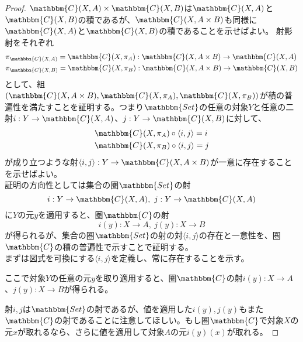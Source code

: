\documentclass[uplatex,dvipdfmx]{jsarticle}
\newcommand{\cat}[1]{\mathbbm{#1}}
\newcommand{\arrow}{\rightarrow}
\newcommand{\tuple}[1]{\langle #1\rangle}
\newcommand{\mor}[3]{#1:#2\arrow #3}
\newcommand{\arset}[3]{\cat{#1}(#2,#3)}
\newtheorem{proof}{証明}[section]
\numberwithin{proof}{subsection}
\begin{document}
	\begin{proof}
		$\arset{C}{X}{A}\times\arset{C}{X}{B}$は$\arset{C}{X}{A}$と$\arset{C}{X}{B}$の積であるが、$\arset{C}{X}{A\times B}$も同様に$\arset{C}{X}{A}$と$\arset{C}{X}{B}$の積であることを示せばよい。
		射影射をそれぞれ
		\begin{align*}
			&\pi_{\arset{C}{X}{A}}=\mor{\arset{C}{X}{\pi_A}}{\arset{C}{X}{A\times B}}{\arset{C}{X}{A}}\\
			&\pi_{\arset{C}{X}{B}}=\mor{\arset{C}{X}{\pi_B}}{\arset{C}{X}{A\times B}}{\arset{C}{X}{B}}
		\end{align*}
		として、組$(\arset{C}{X}{A\times B},\arset{C}{X}{\pi_A},\arset{C}{X}{\pi_B})$が積の普遍性を満たすことを証明する。つまり$\cat{Set}$の任意の対象$Y$と任意の二射$\mor{i}{Y}{\arset{C}{X}{A}}$、$\mor{j}{Y}{\arset{C}{X}{B}}$に対して、
		\begin{align*}
			&\arset{C}{X}{\pi_A}\circ\tuple{i,j}=i\\
			&\arset{C}{X}{\pi_B}\circ\tuple{i,j}=j
		\end{align*}
		が成り立つような射$\mor{\tuple{i,j}}{Y}{\arset{C}{X}{A\times B}}$が一意に存在することを示せばよい。\\
    証明の方向性としては集合の圏$\cat{Set}$の射\[\mor{i}{Y}{\arset{C}{X}{A}},\ \mor{j}{Y}{\arset{C}{X}{A}}\]に$Y$の元$y$を適用すると、圏$\cat{C}$の射\[\mor{i(y)}{X}{A},\ \mor{j(y)}{X}{B}\]が得られるが、集合の圏$\cat{Set}$の射の対$\tuple{i,j}$の存在と一意性を、圏$\cat{C}$の積の普遍性で示すことで証明する。\\
		まずは図式を可換にする$\tuple{i,j}$を定義し、常に存在することを示す。
		\begin{center}
		\end{center}
		ここで対象$Y$の任意の元$y$を取り適用すると、圏$\cat{C}$の射$\mor{i(y)}{X}{A}$、$\mor{j(y)}{X}{B}$が得られる。

		射$i,j$は$\cat{Set}$の射であるが、値を適用した$i(y),j(y)$もまた$\cat{C}$の射であることに注意してほしい。もし圏$\cat{C}$で対象$X$の元$x$が取れるなら、さらに値を適用して対象$A$の元$i(y)(x)$が取れる。


\end{proof}
\end{document}
